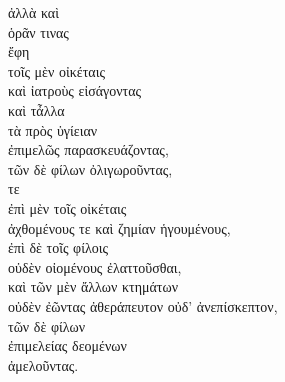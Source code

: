 

{\large
\noindent ἀλλὰ καὶ  \\
ὁρᾶν τινας \\
ἔφη \\
\tabto{2em} τοῖς μὲν οἰκέταις \\
\tabto{2em} καὶ ἰατροὺς εἰσάγοντας \\
\tabto{2em} καὶ τἆλλα \\
\tabto{3em} τὰ πρὸς ὑγίειαν \\
\tabto{2em} ἐπιμελῶς παρασκευάζοντας, \\
\tabto{2em} τῶν δὲ φίλων ὀλιγωροῦντας, \\
 τε  \\
\tabto{2em} ἐπὶ μὲν τοῖς οἰκέταις \\
\tabto{3em} ἀχθομένους τε καὶ ζημίαν ἡγουμένους, \\
\tabto{2em} ἐπὶ δὲ τοῖς φίλοις \\
\tabto{3em} οὐδὲν οἰομένους ἐλαττοῦσθαι, \\
καὶ τῶν μὲν ἄλλων κτημάτων \\
\tabto{2em} οὐδὲν ἐῶντας ἀθεράπευτον οὐδ' ἀνεπίσκεπτον, \\
τῶν δὲ φίλων \\
\tabto{2em} ἐπιμελείας δεομένων \\
ἀμελοῦντας. \\

}

